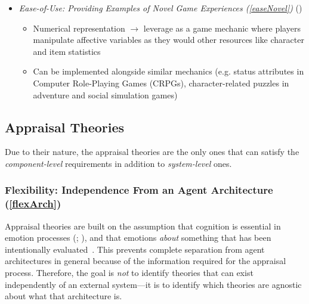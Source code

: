 \begin{itemize}
    \item \textit{Ease-of-Use: Providing Examples of Novel Game Experiences
        (\ref{easeNovel})} (\good)
    \begin{itemize}
        \item Numerical representation $\rightarrow$ leverage as a game
        mechanic where players manipulate affective variables as they would
        other resources like character and item statistics~\citep[p.~292, 466,
        559--560, 578]{adams2014fundamentals}

        \item Can be implemented alongside similar mechanics (e.g. status
        attributes in Computer Role-Playing Games (CRPGs), character-related
        puzzles in adventure and social simulation games)
    \end{itemize}
\end{itemize}

\subsection{Appraisal Theories}
Due to their nature, the appraisal theories are the only ones that can satisfy
the \textit{component-level} requirements in addition to \textit{system-level}
ones.

\subsubsection{Flexibility: Independence From an Agent Architecture
    (\ref{flexArch})}
Appraisal theories are built on the assumption that cognition is essential in
emotion processes (;
), and that emotions \textit{about}
something that has been intentionally evaluated~\citep[p.~11]{ortony2021all}.
This prevents complete separation from agent architectures in general because
of the information required for the appraisal process. Therefore, the goal is
\textit{not} to identify theories that can exist independently of an external
system---it is to identify which theories are agnostic about what that
architecture is.

